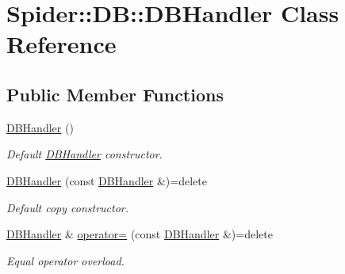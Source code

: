 \hypertarget{class_spider_1_1_d_b_1_1_d_b_handler}{}\section{Spider\+:\+:DB\+:\+:D\+B\+Handler Class Reference}
\label{class_spider_1_1_d_b_1_1_d_b_handler}
\subsection*{Public Member Functions}
\begin{DoxyCompactItemize}
\item 
\mbox{\label{class_spider_1_1_d_b_1_1_d_b_handler_a0f7f1767a084f374feb6ce414adde9c9}} 
\hyperlink{class_spider_1_1_d_b_1_1_d_b_handler_a0f7f1767a084f374feb6ce414adde9c9}{D\+B\+Handler} ()
\begin{DoxyCompactList}\small\item\em Default \hyperlink{class_spider_1_1_d_b_1_1_d_b_handler}{D\+B\+Handler} constructor. \end{DoxyCompactList}\item 
\mbox{\label{class_spider_1_1_d_b_1_1_d_b_handler_a72a1ba5dbf9777dfb094e295bc9f08a4}} 
\hyperlink{class_spider_1_1_d_b_1_1_d_b_handler_a72a1ba5dbf9777dfb094e295bc9f08a4}{D\+B\+Handler} (const \hyperlink{class_spider_1_1_d_b_1_1_d_b_handler}{D\+B\+Handler} \&)=delete
\begin{DoxyCompactList}\small\item\em Default copy constructor. \end{DoxyCompactList}\item 
\mbox{\label{class_spider_1_1_d_b_1_1_d_b_handler_a8f507845f01a1af5c83a5535e0529442}} 
\hyperlink{class_spider_1_1_d_b_1_1_d_b_handler}{D\+B\+Handler} \& \hyperlink{class_spider_1_1_d_b_1_1_d_b_handler_a8f507845f01a1af5c83a5535e0529442}{operator=} (const \hyperlink{class_spider_1_1_d_b_1_1_d_b_handler}{D\+B\+Handler} \&)=delete
\begin{DoxyCompactList}\small\item\em Equal operator overload. \end{DoxyCompactList}\item 
\mbox{\label{class_spider_1_1_d_b_1_1_d_b_handler_a86700944ee698f784de64c20e5bb6f86}} 

\end{DoxyCompactItemize}
